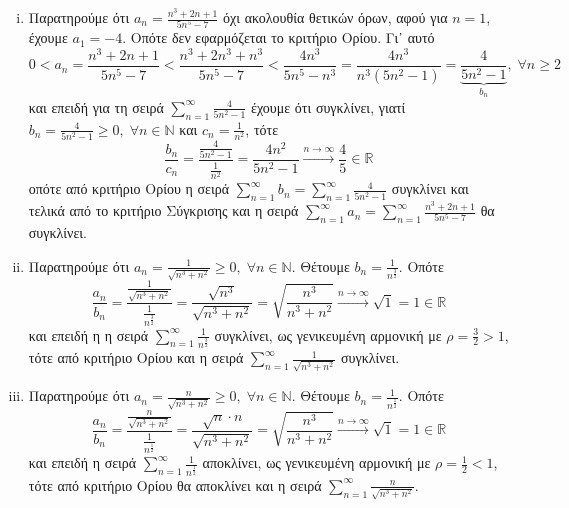 \begin{enumerate}
\begin{enumerate}[i)]
        \item Παρατηρούμε ότι $ a_{n}= \frac{n^{3}+2n+1}{5n^{5}-7} $ όχι 
            ακολουθία θετικών όρων, αφού για $ n=1 $, έχουμε $ a_{1}=-4$. Οπότε δεν 
            εφαρμόζεται το κριτήριο Ορίου. Γι᾽ αυτό
            \[
                0 < a_{n}= \frac{n^{3}+2n+1}{5n^{5}-7} < 
                \frac{n^{3}+2n^{3}+n^{3}}{5n^{5}-7} < \frac{4n^{3}}{5n^{5}-n^{3}} = 
                \frac{4n^{3}}{n^{3}(5n^{2}-1)} = \underbrace{\frac{4}{5n^{2}-1}}_
                {b_{n}}, \; \forall n \geq 2
            \] 
            και επειδή για τη σειρά $ \sum_{n=1}^{\infty} \frac{4}{5n^{2}-1} $ 
            έχουμε ότι συγκλίνει, γιατί 
            $
                b_{n} = \frac{4}{5n^{2}-1} \geq 0, \; \forall n \in \mathbb{N}
            $ 
            και $ c_{n} = \frac{1}{n^{2}} $, τότε
            \[
                \frac{b_{n}}{c_{n}} = \frac{\frac{4}{5n^{2}-1}}{\frac{1}{n^{2}}} = 
                \frac{4n^{2}}{5n^{2}-1} \xrightarrow{n \to \infty} \frac{4}{5} 
                \in \mathbb{R} 
            \]
            οπότε από κριτήριο Ορίου η σειρά $ \sum_{n=1}^{\infty} b_{n}= 
            \sum_{n=1}^{\infty} \frac{4}{5n^{2}-1}$ συγκλίνει και τελικά 
            από το κριτήριο Σύγκρισης
            και η σειρά $ \sum_{n=1}^{\infty} a_{n} = \sum_{n=1}^{\infty}
            \frac{n^{3}+2n+1}{5n^{5}-7} $ θα συγκλίνει.

        \item Παρατηρούμε ότι $ a_{n}= \frac{1}{\sqrt{n^{3}+n^{2}}} \geq 0, 
            \; \forall n \in \mathbb{N}$. Θέτουμε $ b_{n} = \frac{1}{n^{\frac{3}{2}}} $.
            Οπότε
            \[
                \frac{a_{n}}{b_{n}} =
                \frac{\frac{1}{\sqrt{n^{3}+n^{2}}}}{\frac{1}{n^{\frac{3}{2}}}} = 
                \frac{\sqrt{n^{3}}}{\sqrt{n^{3}+n^{2}}} = 
                \sqrt{\frac{n^{3}}{n^{3}+n^{2}}}
                \xrightarrow{n \to \infty} \sqrt{1}=1 \in \mathbb{R} 
             \] 
             και επειδή η η σειρά $ \sum_{n=1}^{\infty} \frac{1}{n^{\frac{3}{2}}} $ 
             συγκλίνει, ως γενικευμένη αρμονική με $ \rho = \frac{3}{2} >1 $, τότε 
             από κριτήριο Ορίου και η σειρά $ \sum_{n=1}^{\infty} 
             \frac{1}{\sqrt{n^{3}+n^{2}} } $ συγκλίνει.

     \item Παρατηρούμε ότι $ a_{n}= \frac{n}{\sqrt{n^{3}+n^{2}}} \geq 0, 
         \; \forall n \in \mathbb{N} $. Θέτουμε $ b_{n}= \frac{1}{n^{\frac{1}{2}}} $. 
         Οπότε
         \[
             \frac{a_{n}}{b_{n}} = 
             \frac{\frac{n}{\sqrt{n^{3}+n^{2}}}}{\frac{1}{n^{\frac{1}{2}}}} =
             \frac{\sqrt{n}\cdot n}{\sqrt{n^{3}+n^{2}}} = 
             \sqrt{\frac{n^{3}}{n^{3}+n^{2}}} 
             \xrightarrow{n \to \infty} \sqrt{1}=1 \in \mathbb{R}
          \] 
          και επειδή η σειρά $ \sum_{n=1}^{\infty} \frac{1}{n^{\frac{1}{2}}} $ 
          αποκλίνει, ως γενικευμένη αρμονική με $ \rho = \frac{1}{2} <1 $, 
          τότε από κριτήριο Ορίου θα αποκλίνει και η σειρά $ 
          \sum_{n=1}^{\infty} \frac{n}{\sqrt{n^{3}+n^{2}}}$.
    \end{enumerate}


\end{enumerate}
